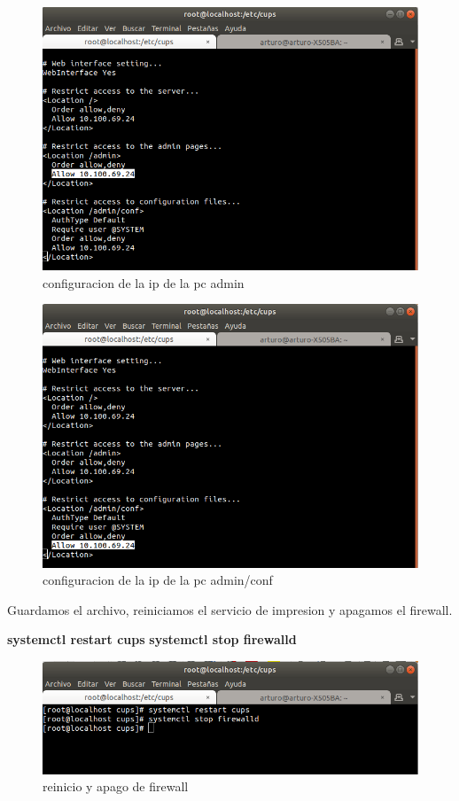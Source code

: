 \FloatBarrier
\begin{figure}[htbp!]
		\centering
			\includegraphics[width=.9\textwidth]{images/r6_2}
		\caption{configuracion de la ip de la pc admin}
		\label{image:r6_2}
\end{figure}
\FloatBarrier

\FloatBarrier
\begin{figure}[htbp!]
		\centering
			\includegraphics[width=.9\textwidth]{images/r6_3}
		\caption{configuracion de la ip de la pc admin/conf}
		\label{image:r6_3}
\end{figure}
\FloatBarrier
Guardamos el archivo,  reiniciamos el servicio de impresion y apagamos el firewall.
\\
\begin{center}
						\textbf{systemctl restart cups}
						\textbf{systemctl stop firewalld}
\end {center}
\FloatBarrier
\begin{figure}[htbp!]
		\centering
			\includegraphics[width=.9\textwidth]{images/r7}
		\caption{reinicio y apago de firewall}
		\label{image:r7}
\end{figure}
\FloatBarrier

